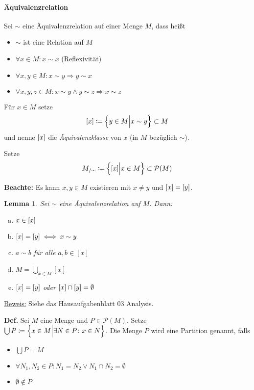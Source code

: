 \documentclass{scrreprt}
\newtheorem*{lemma}{Lemma}
\begin{document}
\paragraph{Äquivalenzrelation} Sei $\sim$ eine Äquivalenzrelation auf einer
Menge $M$, dass heißt
\begin{itemize}
\item $\sim$ ist eine Relation auf $M$
\item $\forall x \in M \colon x \sim x$ (Reflexivität)
\item $\forall x, y \in M \colon x \sim y \Rightarrow y \sim x$
\item $\forall x, y, z \in M \colon x \sim y \land y \sim z \Rightarrow x \sim z$
\end{itemize}

Für $x \in M$ setze
\[
  \qty[x] \coloneqq \qty\Big{ y \in M {\Big |} x \sim y} \subset M
\]
und nenne $\qty[x]$ die \emph{Äquivalenzklasse} von $x$
(in $M$ bezüglich $\sim$).

Setze
\[
  M_{/ \sim} \coloneqq \qty\Big{\qty[x] {\Big |} x \in M}
  \subset \mathcal{P}(M)
\]

\textbf{Beachte:} Es kann $x, y \in M$ existieren mit $x \ne y$ und
$\qty[x] = \qty[y]$.

\begin{lemma}
  Sei $\sim$ eine Äquivalenzrelation auf $M$.
  Dann:
  \begin{enumerate}[(a)]
  \item $x \in \qty[x]$
  \item $\qty[x] = \qty[y] \iff x \sim y$
  \item $a \sim b$ für alle $a, b \in [x]$
  \item $M = \underset{x \in M}\bigcup [x]$
  \item $\qty[x] = \qty[y]$ oder $\qty[x] \cap \qty[y] = \emptyset$
  \end{enumerate}
\end{lemma}

\underline{Beweis:} Siehe das Hausaufgabenblatt 03 Analysis.

\textbf{Def.} Sei $M$ eine Menge und $P \in \mathcal{P}(M)$.
Setze $\bigcup P \coloneqq \qty\Big{ x \in M {\Big |}
  \exists N \in P \colon x \in N}$.
Die Menge $P$ wird eine Partition genannt, falls
\begin{itemize}
\item $\bigcup P = M$
\item $\forall N_1, N_2 \in P \colon N_1 = N_2 \lor N_1 \cap N_2 = \emptyset$
\item $\emptyset \notin P$
\end{itemize}
\end{document}
